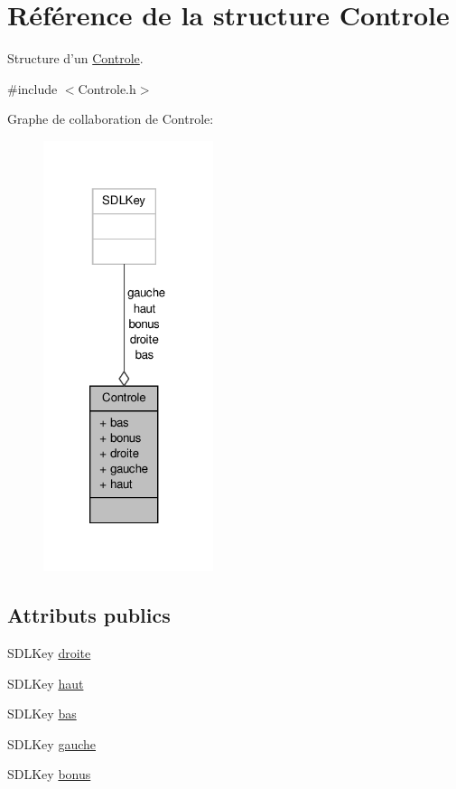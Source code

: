 \hypertarget{structControle}{\section{Référence de la structure Controle}
\label{structControle}
}


Structure d'un \hyperlink{structControle}{Controle}.  




{\ttfamily \#include $<$Controle.\-h$>$}



Graphe de collaboration de Controle\-:\nopagebreak
\begin{figure}[H]
\begin{center}
\leavevmode
\includegraphics[width=141pt]{structControle__coll__graph}
\end{center}
\end{figure}
\subsection*{Attributs publics}
\begin{DoxyCompactItemize}
\item 
S\-D\-L\-Key \hyperlink{structControle_a1178797db7b9f5956c553feea90b828d}{droite}
\item 
S\-D\-L\-Key \hyperlink{structControle_a515a70782a9e7e6f5fbf9f99815b5ae2}{haut}
\item 
S\-D\-L\-Key \hyperlink{structControle_a5b5c96bf02d58115b53eaa683f372faf}{bas}
\item 
S\-D\-L\-Key \hyperlink{structControle_ae86d63d5b63cd831f57ce8383d5488af}{gauche}
\item 
S\-D\-L\-Key \hyperlink{structControle_ad6ce9209cfccf9b61fbaf5bc149b64e9}{bonus}
\end{DoxyCompactItemize}


